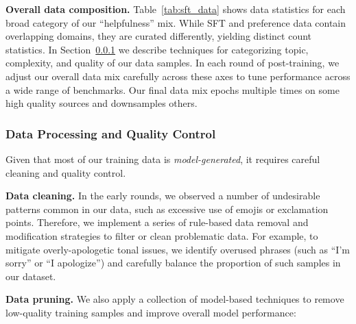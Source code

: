 \textbf{Overall data composition.} Table~\ref{tab:sft_data} shows data statistics for each broad category of our ``helpfulness'' mix. While SFT and preference data contain overlapping domains, they are curated differently, yielding distinct count statistics. In Section~\ref{subsubsec:data_clean} we describe techniques for categorizing topic, complexity, and quality of our data samples. In each round of post-training, we adjust our overall data mix carefully across these axes to tune performance across a wide range of benchmarks. Our final data mix epochs multiple times on some high quality sources and downsamples others.

\subsubsection{Data Processing and Quality Control}
\label{subsubsec:data_clean} 

Given that most of our training data is \emph{model-generated}, it requires careful cleaning and quality control. 

\textbf{Data cleaning.} In the early rounds, we observed a number of undesirable patterns common in our data, such as excessive use of emojis or exclamation points. Therefore, we implement a series of rule-based data removal and modification strategies to filter or clean problematic data. For example, to mitigate overly-apologetic tonal issues, we identify overused phrases (such as ``I'm sorry'' or ``I apologize'') and carefully balance the proportion of such samples in our dataset. 

\textbf{Data pruning.} We also apply a collection of model-based techniques to remove low-quality training samples and improve overall model performance:

